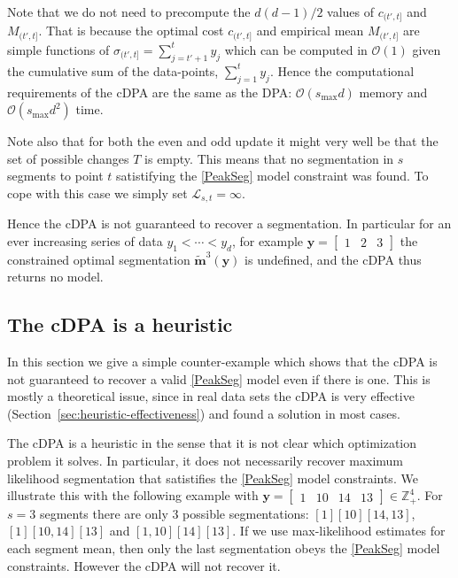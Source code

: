 \documentclass{article}
\newcommand{\ZZ}{\mathbb Z}
\begin{document}
Note that we do not need to precompute the $d(d-1)/2$ values of
$c_{(t',t]}$ and $M_{(t', t]}$. That is because the optimal cost
$c_{(t',t]}$ and empirical mean $M_{(t', t]}$ are simple functions of
$\sigma_{(t', t]} =\sum_{j=t'+1}^t y_j$ which can be computed in
$\mathcal{O}(1)$ given the cumulative sum of the data-points,
$\sum_{j=1}^t y_j$. Hence the computational requirements of the cDPA
are the same as the DPA: $\mathcal{O}(s_{\text{max}} d)$ memory and
$\mathcal O(s_{\text{max}} d^2)$ time.

Note also that for both the even and odd update it might very well be
that the set of possible changes $T$ is empty.  This means that no
segmentation in $s$ segments to point $t$ satistifying the
\ref{PeakSeg} model constraint was found.  To cope with this case we
simply set ${\mathcal L}_{s, t} = \infty$.

Hence the cDPA is not guaranteed to recover a segmentation. In
particular for an ever increasing series of data $y_1 < \cdots < y_d$,
for example $\mathbf y = \left[ \begin{array}{ccc} 1 & 2 &
    3 \end{array}\right]$ the constrained optimal segmentation
$\mathbf{\tilde m}^3(\mathbf y)$ is undefined, and the cDPA thus
returns no model.

\subsection{The cDPA is a heuristic}
\label{sec:dp-fails}

In this section we give a simple counter-example which shows that the
cDPA is not guaranteed to recover a valid \ref{PeakSeg} model even if there is one. 
This is mostly a theoretical issue, since in real data sets the cDPA is very
effective (Section~\ref{sec:heuristic-effectiveness}) and found a solution in most cases.

The cDPA is a heuristic in the sense that it is not
clear which optimization problem it solves. In particular, it does not
necessarily recover maximum likelihood segmentation that satistifies
the \ref{PeakSeg} model constraints. We illustrate this with the
following example with $\mathbf y = \left[\begin{array}{cccc} 1 & 10 &
    14 & 13
\end{array}\right]\in\ZZ_+^4
$. For $s=3$ segments there are only 3 possible segmentations:
$[1][10][14, 13]$, $[1][10, 14][13]$ and $[1, 10][14][13]$. If we use
max-likelihood estimates for each segment mean, then only the last
segmentation obeys the \ref{PeakSeg} model constraints. However the
cDPA will not recover it.
\end{document}
